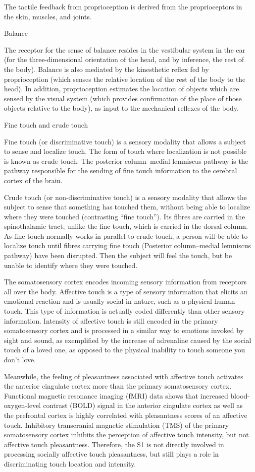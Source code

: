 The tactile feedback from proprioception is derived from the proprioceptors in the skin, muscles, and joints.

Balance

The receptor for the sense of balance resides in the vestibular system in the ear (for the three-dimensional orientation of the head, and by inference, the rest of the body). Balance is also mediated by the kinesthetic reflex fed by proprioception (which senses the relative location of the rest of the body to the head). In addition, proprioception estimates the location of objects which are sensed by the visual system (which provides confirmation of the place of those objects relative to the body), as input to the mechanical reflexes of the body.

Fine touch and crude touch

Fine touch (or discriminative touch) is a sensory modality that allows a subject to sense and localize touch. The form of touch where localization is not possible is known as crude touch. The posterior column--medial lemniscus pathway is the pathway responsible for the sending of fine touch information to the cerebral cortex of the brain.

Crude touch (or non-discriminative touch) is a sensory modality that allows the subject to sense that something has touched them, without being able to localize where they were touched (contrasting ``fine touch''). Its fibres are carried in the spinothalamic tract, unlike the fine touch, which is carried in the dorsal column. As fine touch normally works in parallel to crude touch, a person will be able to localize touch until fibres carrying fine touch (Posterior column--medial lemniscus pathway) have been disrupted. Then the subject will feel the touch, but be unable to identify where they were touched.

The somatosensory cortex encodes incoming sensory information from receptors all over the body. Affective touch is a type of sensory information that elicits an emotional reaction and is usually social in nature, such as a physical human touch. This type of information is actually coded differently than other sensory information. Intensity of affective touch is still encoded in the primary somatosensory cortex and is processed in a similar way to emotions invoked by sight and sound, as exemplified by the increase of adrenaline caused by the social touch of a loved one, as opposed to the physical inability to touch someone you don't love.

Meanwhile, the feeling of pleasantness associated with affective touch activates the anterior cingulate cortex more than the primary somatosensory cortex. Functional magnetic resonance imaging (fMRI) data shows that increased blood-oxygen-level contrast (BOLD) signal in the anterior cingulate cortex as well as the prefrontal cortex is highly correlated with pleasantness scores of an affective touch. Inhibitory transcranial magnetic stimulation (TMS) of the primary somatosensory cortex inhibits the perception of affective touch intensity, but not affective touch pleasantness. Therefore, the S1 is not directly involved in processing socially affective touch pleasantness, but still plays a role in discriminating touch location and intensity.

